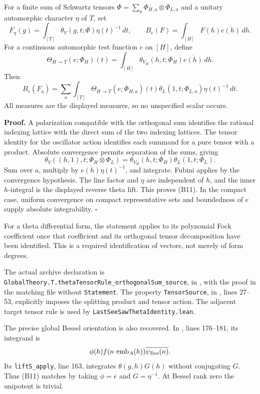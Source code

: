 \documentclass[11pt]{article}
\theoremstyle{definition}\newtheorem{definition}[theorem]{Definition}\newtheorem{remark}[theorem]{Remark}
\begin{document}
For a finite sum of Schwartz tensors
$\Phi=\sum_a\Phi_{H,a}\otimes\Phi_{L,a}$ and a unitary automorphic character $\eta$ of $T$, set
\[
 F_\eta(g)=\int_{[T]}\theta_V(g,t;\Phi)\eta(t)^{-1}\,dt,
 \qquad
 B_e(F)=\int_{[H]}F(h)\overline{e(h)}\,dh.
\]
For a continuous automorphic test function $e$ on $[H]$, define
\[
 \Theta_{H\to T}(e;\Phi_H)(t)=
 \int_{[H]}\theta_{V_H}(h,t;\Phi_H)\overline{e(h)}\,dh.
\]
Then
\[
 B_e(F_\eta)=\sum_a\int_{[T]}
 \Theta_{H\to T}(e;\Phi_{H,a})(t)
 \theta_L(1,t;\Phi_{L,a})\eta(t)^{-1}\,dt.
 \tag{B11}
\]
All measures are the displayed measures, so no unspecified scalar occurs.

\textbf{Proof.} A polarization compatible with the orthogonal sum identifies the rational indexing lattice with the direct sum of the two indexing lattices. The tensor identity for the oscillator action identifies each summand for a pure tensor with a product. Absolute convergence permits separation of the sums, giving
\[
 \theta_V((h,1),t;\Phi_H\otimes\Phi_L)
       =\theta_{V_H}(h,t;\Phi_H)\theta_L(1,t;\Phi_L).
\]
Sum over $a$, multiply by $\overline{e(h)}\eta(t)^{-1}$, and integrate. Fubini applies by the convergence hypothesis. The line factor and $\eta$ are independent of $h$, and the inner $h$-integral is the displayed reverse theta lift. This proves (B11). In the compact case, uniform convergence on compact representative sets and boundedness of $e$ supply absolute integrability. \hfill$\square$

For a theta differential form, the statement applies to its polynomial Fock coefficient once that coefficient and its orthogonal tensor decomposition have been identified. This is a required identification of vectors, not merely of form degrees.

The actual archive declaration is
\nolinkurl{GlobalTheory.T.thetaTensorRule_orthogonalSum_source}, in
, with the proof in the matching file without \texttt{Statement}. The property \texttt{TensorSource}, in , lines 27--53, explicitly imposes the splitting product and tensor action. The adjacent target tensor rule is used by \texttt{LastSeeSawThetaIdentity.lean}.

The precise global Bessel orientation is also recovered. In
, lines 176--181, its integrand is
\[
 \phi(h)f(n\,\operatorname{emb}_A(h))\overline{\psi_{\rm Bes}(n)}.
\]
Its \texttt{liftS\_apply}, line 163, integrates $\theta(g,h)G(h)$ without conjugating $G$. Thus (B11) matches by taking $\phi=\overline e$ and $G=\eta^{-1}$. At Bessel rank zero the unipotent is trivial.
\end{document}
